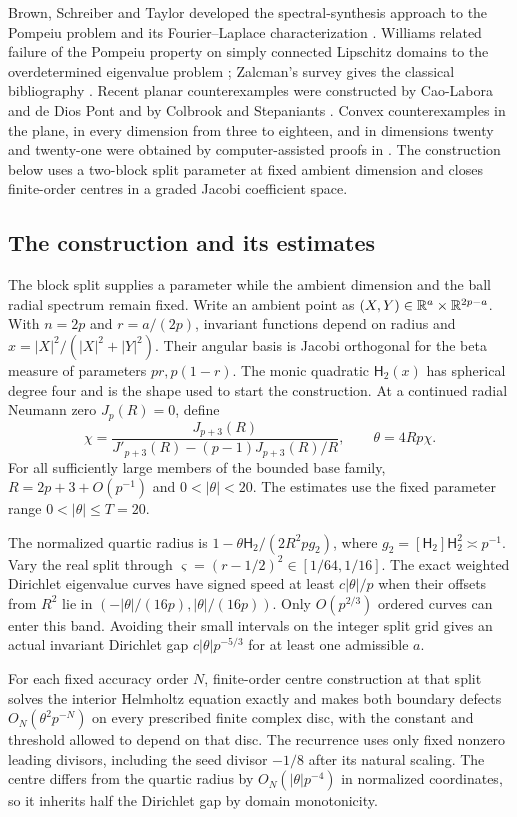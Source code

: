 Brown, Schreiber and Taylor developed the spectral-synthesis
approach to the Pompeiu problem and its Fourier--Laplace
characterization \cite{inf:BST73}. Williams related failure of the
Pompeiu property on simply connected Lipschitz domains to the
overdetermined eigenvalue problem \cite{inf:Wil76};
Zalcman's survey gives the classical
bibliography \cite{inf:Zal92}. Recent planar counterexamples were
constructed by Cao-Labora and de Dios Pont \cite{inf:CLdDP26}
and by Colbrook and Stepaniants \cite{inf:CS26}.
Convex counterexamples in the plane, in every dimension from three
to eighteen, and in dimensions twenty and twenty-one were obtained
by computer-assisted proofs in \cite{inf:Guo26}.
The construction below uses a two-block split parameter at fixed
ambient dimension and closes finite-order centres in a graded
Jacobi coefficient space.

\subsection{The construction and its estimates}

The block split supplies a parameter while the ambient dimension
and the ball radial spectrum remain fixed. Write an ambient point as
$(X,Y)\in\mathbb{R}^a\times\mathbb{R}^{2p-a}$. With $n=2p$ and
$r=a/(2p)$, invariant functions depend on radius and
$x=|X|^2/(|X|^2+|Y|^2)$. Their angular basis is Jacobi orthogonal
for the beta measure of parameters $pr,p(1-r)$.
The monic quadratic $\mathsf H_2(x)$ has spherical degree four and is the
shape used to start the construction.
At a continued radial Neumann zero $J_p(R)=0$, define
\[
 \chi=\frac{J_{p+3}(R)}{J'_{p+3}(R)-(p-1)J_{p+3}(R)/R},
 \qquad \theta=4Rp\chi.
\]
For all sufficiently large members of the bounded base family,
$R=2p+3+O(p^{-1})$ and $0<|\theta|<20$.
The estimates use the fixed parameter range $0<|\theta|\le T=20$.

The normalized quartic radius is
$1-\theta \mathsf H_2/(2R^2pg_2)$, where
$g_2=[\mathsf H_2]\mathsf H_2^2\asymp p^{-1}$.
Vary the real split through $\varsigma=(r-1/2)^2\in[1/64,1/16]$.
The exact weighted Dirichlet eigenvalue curves have signed speed
at least $c|\theta|/p$ when their offsets from $R^2$ lie in
$(-|\theta|/(16p),|\theta|/(16p))$.
Only $O(p^{2/3})$ ordered curves can enter this band.
Avoiding their small intervals on the integer split grid gives an
actual invariant Dirichlet gap $c|\theta|p^{-5/3}$ for at least
one admissible $a$.

For each fixed accuracy order $N$, finite-order centre construction
at that split solves the interior
Helmholtz equation exactly and makes both boundary defects
$O_N(\theta^2p^{-N})$ on every prescribed finite complex disc,
with the constant and threshold allowed to depend on that disc.
The recurrence uses only fixed nonzero leading divisors, including
the seed divisor $-1/8$ after its natural scaling.
The centre differs from the quartic radius by
$O_N(|\theta|p^{-4})$ in normalized coordinates, so it inherits
half the Dirichlet gap by domain monotonicity.

